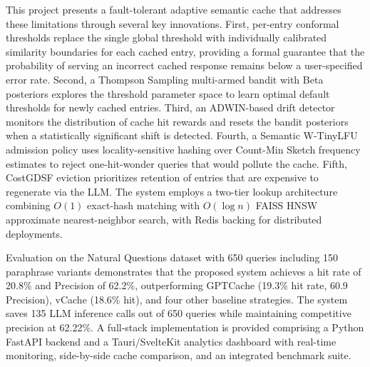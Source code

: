 \documentclass[12pt,a4paper]{report}
\begin{document}
This project presents a fault-tolerant adaptive semantic cache that addresses these limitations through several key innovations. First, per-entry conformal thresholds replace the single global threshold with individually calibrated similarity boundaries for each cached entry, providing a formal guarantee that the probability of serving an incorrect cached response remains below a user-specified error rate. Second, a Thompson Sampling multi-armed bandit with Beta posteriors explores the threshold parameter space to learn optimal default thresholds for newly cached entries. Third, an ADWIN-based drift detector monitors the distribution of cache hit rewards and resets the bandit posteriors when a statistically significant shift is detected. Fourth, a Semantic W-TinyLFU admission policy uses locality-sensitive hashing over Count-Min Sketch frequency estimates to reject one-hit-wonder queries that would pollute the cache. Fifth, CostGDSF eviction prioritizes retention of entries that are expensive to regenerate via the LLM. The system employs a two-tier lookup architecture combining $O(1)$ exact-hash matching with $O(\log n)$ FAISS HNSW approximate nearest-neighbor search, with Redis backing for distributed deployments.

Evaluation on the Natural Questions dataset with 650 queries including 150 paraphrase variants demonstrates that the proposed system achieves a hit rate of 20.8\% and Precision of 62.2\%, outperforming GPTCache (19.3\% hit rate, 60.9 Precision), vCache (18.6\% hit), and four other baseline strategies. The system saves 135 LLM inference calls out of 650 queries while maintaining competitive precision at 62.22\%. A full-stack implementation is provided comprising a Python FastAPI backend and a Tauri/SvelteKit analytics dashboard with real-time monitoring, side-by-side cache comparison, and an integrated benchmark suite.

\newpage
\tableofcontents

\newpage
\listoftables
{}

\newpage
\listoffigures
{}
\end{document}
